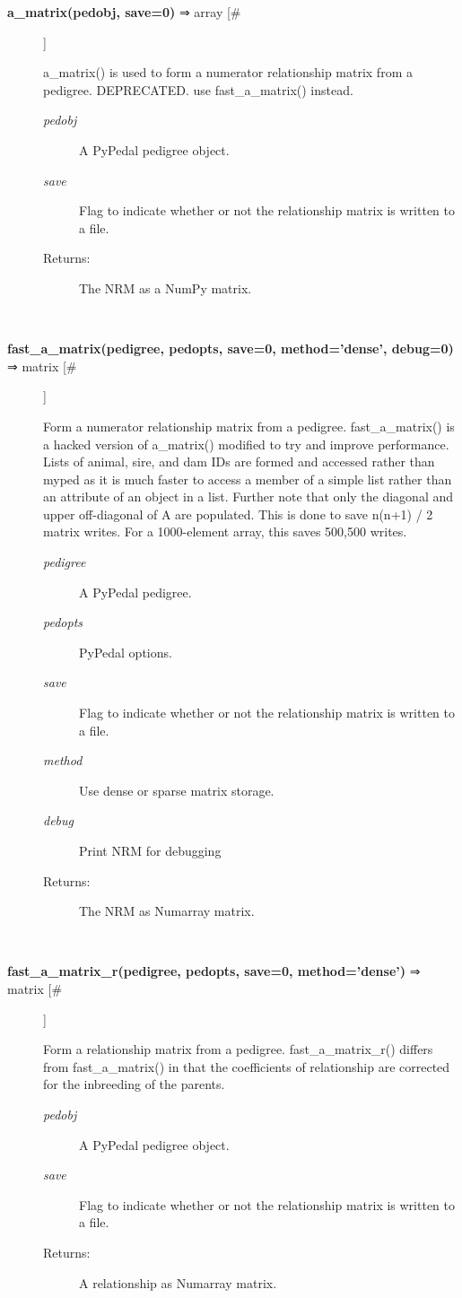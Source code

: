 \begin{description}
\item[\textbf{a\_matrix(pedobj, save=0)} ⇒ array [\#]
]
\par a\_matrix() is used to form a numerator relationship matrix from a pedigree.  DEPRECATED.
use fast\_a\_matrix() instead.
\begin{description}
\item[\textit{pedobj}
]
A PyPedal pedigree object.
\item[\textit{save}
]
Flag to indicate whether or not the relationship matrix is written to a file.
\item[Returns:
]
The NRM as a NumPy matrix.
\end{description}\\

\item[\textbf{fast\_a\_matrix(pedigree, pedopts, save=0, method='dense', debug=0)} ⇒ matrix [\#]
]
\par Form a numerator relationship matrix from a pedigree.  fast\_a\_matrix() is a hacked version of a\_matrix()
modified to try and improve performance.  Lists of animal, sire, and dam IDs are formed and accessed rather
than myped as it is much faster to access a member of a simple list rather than an attribute of an object in a
list.  Further note that only the diagonal and upper off-diagonal of A are populated.  This is done to save
n(n+1) / 2 matrix writes.  For a 1000-element array, this saves 500,500 writes.
\begin{description}
\item[\textit{pedigree}
]
A PyPedal pedigree.
\item[\textit{pedopts}
]
PyPedal options.
\item[\textit{save}
]
Flag to indicate whether or not the relationship matrix is written to a file.
\item[\textit{method}
]
Use dense or sparse matrix storage.
\item[\textit{debug}
]
Print NRM for debugging
\item[Returns:
]
The NRM as Numarray matrix.
\end{description}\\

\item[\textbf{fast\_a\_matrix\_r(pedigree, pedopts, save=0, method='dense')} ⇒ matrix [\#]
]
\par Form a relationship matrix from a pedigree.  fast\_a\_matrix\_r() differs from fast\_a\_matrix() in that the
coefficients of relationship are corrected for the inbreeding of the parents.
\begin{description}
\item[\textit{pedobj}
]
A PyPedal pedigree object.
\item[\textit{save}
]
Flag to indicate whether or not the relationship matrix is written to a file.
\item[Returns:
]
A relationship as Numarray matrix.
\end{description}\\


\end{description}
